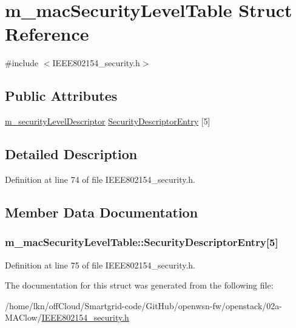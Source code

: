 \hypertarget{structm__mac_security_level_table}{}\section{m\+\_\+mac\+Security\+Level\+Table Struct Reference}
\label{structm__mac_security_level_table}


{\ttfamily \#include $<$I\+E\+E\+E802154\+\_\+security.\+h$>$}

\subsection*{Public Attributes}
\begin{DoxyCompactItemize}
\item 
\hyperlink{structm__security_level_descriptor}{m\+\_\+security\+Level\+Descriptor} \hyperlink{structm__mac_security_level_table_a517e097dbccf98640941f4c27705440e}{Security\+Descriptor\+Entry} \mbox{[}5\mbox{]}
\end{DoxyCompactItemize}


\subsection{Detailed Description}


Definition at line 74 of file I\+E\+E\+E802154\+\_\+security.\+h.



\subsection{Member Data Documentation}
\subsubsection[{\texorpdfstring{Security\+Descriptor\+Entry}{SecurityDescriptorEntry}}]{ m\+\_\+mac\+Security\+Level\+Table\+::\+Security\+Descriptor\+Entry\mbox{[}5\mbox{]}}\hypertarget{structm__mac_security_level_table_a517e097dbccf98640941f4c27705440e}{}\label{structm__mac_security_level_table_a517e097dbccf98640941f4c27705440e}


Definition at line 75 of file I\+E\+E\+E802154\+\_\+security.\+h.



The documentation for this struct was generated from the following file\+:\begin{DoxyCompactItemize}
\item 
/home/lkn/off\+Cloud/\+Smartgrid-\/code/\+Git\+Hub/openwsn-\/fw/openstack/02a-\/\+M\+A\+Clow/\hyperlink{_i_e_e_e802154__security_8h}{I\+E\+E\+E802154\+\_\+security.\+h}\end{DoxyCompactItemize}
